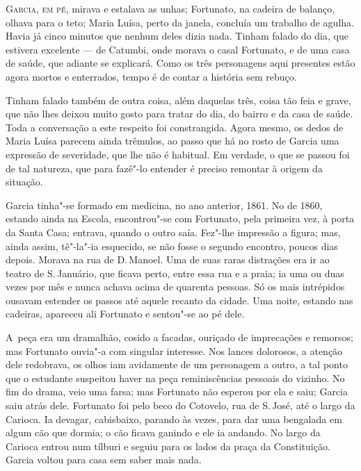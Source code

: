 \begin{linenumbers}

\textsc{Garcia, em pé,} mirava e estalava as unhas; Fortunato, na cadeira de
balanço, olhava para o teto; Maria Luísa, perto da janela, concluía um
trabalho de agulha. Havia já cinco minutos que nenhum deles dizia nada.
Tinham falado do dia, que estivera excelente --- de Catumbi, onde morava
o casal Fortunato, e de uma casa de saúde, que adiante se explicará.
Como os três personagens aqui presentes estão agora mortos e enterrados,
tempo é de contar a história sem rebuço.

Tinham falado também de outra coisa, além daquelas três, coisa tão feia
e grave, que não lhes deixou muito gosto para tratar do dia, do bairro e
da casa de saúde. Toda a conversação a este respeito foi constrangida.
Agora mesmo, os dedos de Maria Luísa parecem ainda trêmulos, ao passo
que há no rosto de Garcia uma expressão de severidade, que lhe não é
habitual. Em verdade, o que se passou foi de tal natureza, que para
fazê"-lo entender é preciso remontar à origem da situação.

Garcia tinha"-se formado em medicina, no ano anterior, 1861. No de 1860,
estando ainda na Escola, encontrou"-se com Fortunato, pela primeira vez,
à porta da Santa Casa; entrava, quando o outro saía. Fez"-lhe impressão a
figura; mas, ainda assim, tê"-la"-ia esquecido, se não fosse o segundo
encontro, poucos dias depois. Morava na rua de D.\,Manoel. Uma de suas
raras distrações era ir ao teatro de S.\,Januário, que ficava perto,
entre essa rua e a praia; ia uma ou duas vezes por mês e nunca achava
acima de quarenta pessoas. Só os mais intrépidos ousavam estender os
passos até aquele recanto da cidade. Uma noite, estando nas cadeiras,
apareceu ali Fortunato e sentou"-se ao pé dele.

A~peça era um dramalhão, cosido a facadas, ouriçado de imprecações e
remorsos; mas Fortunato ouvia"-a com singular interesse. Nos lances
dolorosos, a atenção dele redobrava, os olhos iam avidamente de um
personagem a outro, a tal ponto que o estudante suspeitou haver na peça
reminiscências pessoais do vizinho. No fim do drama, veio uma farsa; mas
Fortunato não esperou por ela e saiu; Garcia saiu atrás dele. Fortunato
foi pelo beco do Cotovelo, rua de S.\,José, até o largo da Carioca. Ia
devagar, cabisbaixo, parando às vezes, para dar uma bengalada em algum
cão que dormia; o cão ficava ganindo e ele ia andando. No largo da
Carioca entrou num tílburi e seguiu para os lados da praça da
Constituição. Garcia voltou para casa sem saber mais nada.


\end{linenumbers}
